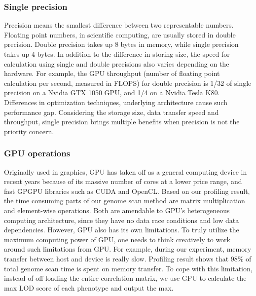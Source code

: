 \documentclass[9pt,twocolumn,twoside,lineno]{gsag3jnl}
\begin{document}
 
\subsubsection{Single precision}
Precision means the smallest difference between two representable numbers.
Floating point numbers, in scientific computing, are usually stored in double precision. 
Double precision takes up 8 bytes in memory, while single precision takes up 4 bytes. 
In addition to the difference in storing size, the speed for calculation using single and double precisions also varies 
depending on the hardware.  For example, the GPU throughput (number of floating point calculation per second, measured in FLOPS)
for double precision is 1/32 of single precision on a Nvidia GTX 1050 GPU, and 1/4 on a Nvidia Tesla K80. 
Differences in optimization techniques, underlying architecture cause such performance gap. 
Considering the storage size, data transfer speed and throughput, single precision brings multiple benefits when precision is not the priority concern. 


\subsubsection{GPU operations}

Originally used in graphics, GPU has taken off as a general computing device in recent years because of its massive number of cores at a lower price range, and fast GPGPU libraries such as CUDA and OpenCL.
Based on our profiling result, the time consuming parts of our genome scan method are matrix multiplication and element-wise operations. 
Both are amendable to GPU's heterogeneous computing architecture, since they have no data race conditions and low data dependencies. 
However, GPU also has its own limitations. 
To truly utilize the maximum computing power of GPU, one needs to think creatively to work around such limitations from GPU. 
For example, during our experiment, memory transfer between host and device is really slow. 
Profiling result shows that 98\% of total genome scan time is spent on memory transfer. 
To cope with this limitation, instead of off-loading the entire correlation matrix, we use GPU to calculate the max LOD score of each phenotype and output the max. 
\end{document}

